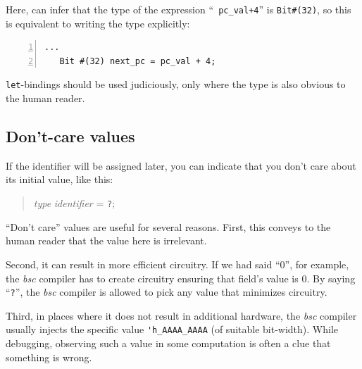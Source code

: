 Here, {\bsc} can infer that the type of the expression ``{\tt
pc\_val+4}'' is \verb|Bit#(32)|, so this is equivalent to writing the
type explicitly:

{\footnotesize
\begin{Verbatim}[frame=single, numbers=left]
   ...
   Bit #(32) next_pc = pc_val + 4;
\end{Verbatim}
}

{\tt let}-bindings should be used judiciously, only where the type is
also obvious to the human reader.


\subsection{Don't-care values} 

\label{Sec_Dont_Care_Values}


If the identifier will be assigned later, you can indicate that you
don't care about its initial value, like this:

\begin{quote}
\emph{type} \emph{identifier} = {\tt ?};
\end{quote}

``Don't care'' values are useful for several reasons.  First, this
conveys to the human reader that the value here is irrelevant.

Second, it can result in more efficient circuitry.  If we had said
``0'', for example, the \emph{bsc} compiler has to create circuitry
ensuring that field's value is 0. By saying ``\verb|?|'', the
\emph{bsc} compiler is allowed to pick any value that minimizes
circuitry.

Third, in places where it does not result in additional hardware, the
\emph{bsc} compiler usually injects the specific value
\verb|'h_AAAA_AAAA| (of suitable bit-width).  While debugging,
observing such a value in some computation is often a clue that
something is wrong.

\vspace{2ex}


